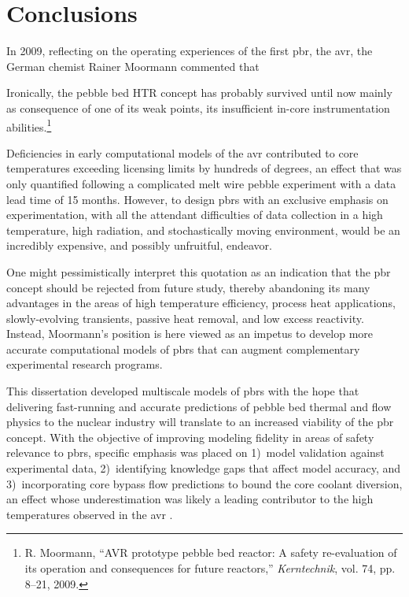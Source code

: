 \chapter{Conclusions}
\label{sec:conclusions}

In 2009, reflecting on the operating experiences of the first \gls{pbr}, the \gls{avr}, the German chemist Rainer Moormann commented that

\begin{displayquote}
Ironically, the pebble bed HTR concept has probably survived until now mainly as consequence of one of its weak points, its insufficient in-core instrumentation abilities.\hspace{0.01cm}\footnote{R. Moormann, ``AVR prototype pebble bed reactor: A safety re-evaluation of its operation and consequences for future reactors,'' \textit{Kerntechnik}, vol. 74, pp. 8--21, 2009.}
\end{displayquote}

Deficiencies in early computational models of the \gls{avr} contributed to core temperatures exceeding licensing limits by hundreds of degrees, an effect that was only quantified following a complicated melt wire pebble experiment with a data lead time of 15 months. However, to design \glspl{pbr} with an exclusive emphasis on experimentation, with all the attendant difficulties of data collection in a high temperature, high radiation, and stochastically moving environment, would be an incredibly expensive, and possibly unfruitful, endeavor. 

One might pessimistically interpret this quotation as an indication that the \gls{pbr} concept should be rejected from future study, thereby abandoning its many advantages in the areas of high temperature efficiency, process heat applications, slowly-evolving transients, passive heat removal, and low excess reactivity. Instead, Moormann's position is here viewed as an impetus to develop more accurate computational models of \glspl{pbr} that can augment complementary experimental research programs.

This dissertation developed multiscale models of \glspl{pbr} with the hope that delivering fast-running and accurate predictions of pebble bed thermal and flow physics to the nuclear industry will translate to an increased viability of the \gls{pbr} concept. With the objective of improving modeling fidelity in areas of safety relevance to \glspl{pbr}, specific emphasis was placed on 1)~model validation against experimental data, 2)~identifying knowledge gaps that affect model accuracy, and 3)~incorporating core bypass flow predictions to bound the core coolant diversion, an effect whose underestimation was likely a leading contributor to the high temperatures observed in the \gls{avr} \cite{viljoen}.

